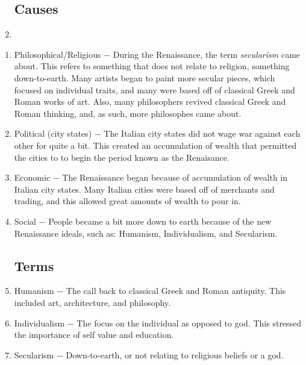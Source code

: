 \documentclass[12pt]{article}
\begin{document}
\begin{enumerate}[label=]
\subsection{Causes}
\item
\end{enumerate}
\vspace{-35pt}
\begin{enumerate}

\item Philosophical/Religious $-$ During the Renaissance, the term \textit{secularism} came about. This refers to something that does not relate to religion, something down-to-earth. Many artists began to paint more secular pieces, which focused on individual traits, and many were based off of classical Greek and Roman works of art. Also, many philosophers revived classical Greek and Roman thinking, and, as such, more philosophes came about.

\item Political (city states) $-$ The Italian city states did not wage war against each other for quite a bit. This created an accumulation of wealth that permitted the cities to to begin the period known as the Renaisance.

\item Economic $-$ The Renaissance began because of accumulation of wealth in Italian city states. Many Italian cities were based off of merchants and trading, and this allowed great amounts of wealth to pour in.

\item Social $-$ People became a bit more down to earth because of the new Renaissance ideals, such as: Humanism, Individualism, and Secularism.

\subsection{Terms}

\item Humanism $-$ The call back to classical Greek and Roman antiquity. This included art, architecture, and philosophy.

\item Individualism $-$ The focus on the individual as opposed to god. This stressed the importance of self value and education.

\item Secularism $-$ Down-to-earth, or not relating to religious beliefs or a god.


\end{enumerate}
\end{document}
